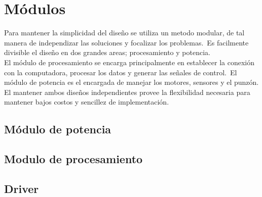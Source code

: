 \chapter{M\'odulos}

Para mantener la simplicidad del dise\~no se utiliza un metodo modular, de tal
manera de independizar las soluciones y focalizar los problemas.\
Es facilmente divisible el dise\~no en dos grandes areas; procesamiento y
potencia.\\

El m\'odulo de procesamiento se encarga principalmente en establecer la
conexi\'on con la computadora, procesar los datos y generar las se\~nales de
control.\
El m\'odulo de potencia es el encargada de manejar los motores, sensores y el
punz\'on.\\

El mantener ambos dise\~nos independientes provee la flexibilidad necesaria
para mantener bajos costos y sencillez de implementaci\'on.


\section{M\'odulo de potencia}\label{cap:motors_section}


\section{Modulo de procesamiento}


\section{Driver}


